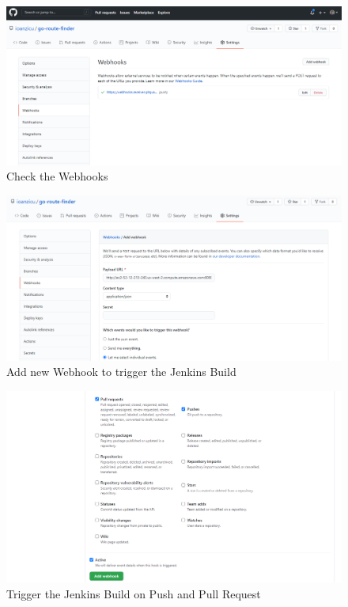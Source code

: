 \documentclass[12pt,a4paper,twoside]{article}
\begin{document}
\begin{figure}[h!]
    \centering
        \includegraphics[width=15cm]{images-aws/48---web-hook.png}
        \caption{Check the Webhooks}
\end{figure}


\begin{figure}[h!]
    \centering
        \includegraphics[width=15cm]{images-aws/49---web-hook-setup.png}
        \caption{Add new Webhook to trigger the Jenkins Build}
\end{figure}


\begin{figure}[h!]
    \centering
        \includegraphics[width=15cm]{images-aws/50---web-hook-setup-pull.png}
        \caption{Trigger the Jenkins Build on Push and Pull Request}
\end{figure}
\end{document}
